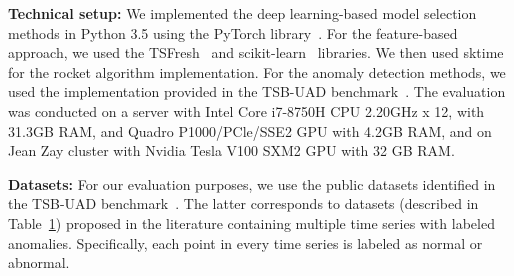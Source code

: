 \begin{table}[tb]
{\begin{tabular}{|c|c|}
        \end{tabular}
        } 
    \vspace{-0.3cm}
    \label{SymbolTable}
\end{table}

\noindent \textbf{Technical setup: }
We implemented the deep learning-based model selection methods in Python 3.5 using the PyTorch library~\cite{NEURIPS2019_bdbca288}. %
For the feature-based approach, we used the TSFresh~\cite{CHRIST201872} and scikit-learn~\cite{JMLR:v12:pedregosa11a} libraries. We then used sktime~\cite{Lning2019sktimeAU} for the rocket algorithm implementation. For the anomaly detection methods, we used the implementation provided in the TSB-UAD benchmark~\cite{10.14778/3529337.3529354}. The evaluation was conducted on a server with Intel Core i7-8750H CPU 2.20GHz x 12, with 31.3GB RAM, and Quadro P1000/PCle/SSE2 GPU with 4.2GB RAM, and on Jean Zay cluster with Nvidia Tesla V100 SXM2 GPU with 32 GB RAM.

\noindent \textbf{Datasets: }
For our evaluation purposes, we use the public datasets identified in the TSB-UAD benchmark~\cite{10.14778/3529337.3529354}. The latter corresponds to datasets (described in Table~\ref{SymbolTable}) proposed in the literature containing multiple time series with labeled anomalies. Specifically, each point in every time series is labeled as normal or abnormal.


